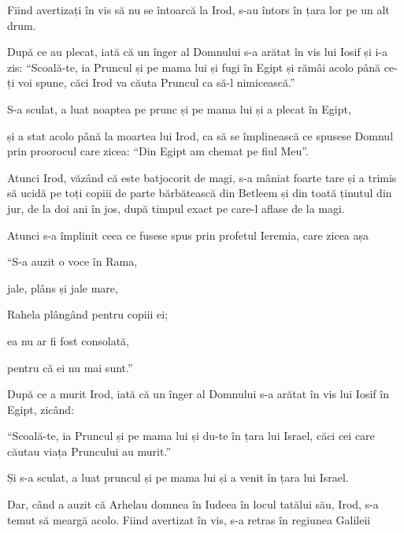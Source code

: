 {Fiind avertizați în vis să nu se întoarcă la Irod, s-au întors în țara lor pe un alt drum.


\par }{\PP {}După ce au plecat, iată că un înger al Domnului s-a arătat în vis lui Iosif și i-a zis: “Scoală-te, ia Pruncul și pe mama lui și fugi în Egipt și rămâi acolo până ce-ți voi spune, căci Irod va căuta Pruncul ca să-l nimicească.”


\par }{\PP {}S-a sculat, a luat noaptea pe prunc și pe mama lui și a plecat în Egipt,

și a stat acolo până la moartea lui Irod, ca să se împlinească ce spusese Domnul prin proorocul care zicea: “Din Egipt am chemat pe fiul Meu”.


\par }{\PP {}Atunci Irod, văzând că este batjocorit de magi, s-a mâniat foarte tare și a trimis să ucidă pe toți copiii de parte bărbătească din Betleem și din toată ținutul din jur, de la doi ani în jos, după timpul exact pe care-l aflase de la magi.

Atunci s-a împlinit ceea ce fusese spus prin profetul Ieremia, care zicea așa


\par }{\Q {}“S-a auzit o voce în Rama,

\par }{\QB jale, plâns și jale mare,

\par }{\Q Rahela plângând pentru copiii ei;

\par }{\QB ea nu ar fi fost consolată,

\par }{\QB pentru că ei nu mai sunt.”


\par }{\PP {}După ce a murit Irod, iată că un înger al Domnului s-a arătat în vis lui Iosif în Egipt, zicând:

“Scoală-te, ia Pruncul și pe mama lui și du-te în țara lui Israel, căci cei care căutau viața Pruncului au murit.”


\par }{\PP {}Și s-a sculat, a luat pruncul și pe mama lui și a venit în țara lui Israel.

Dar, când a auzit că Arhelau domnea în Iudeea în locul tatălui său, Irod, s-a temut să meargă acolo. Fiind avertizat în vis, s-a retras în regiunea Galileii

}
